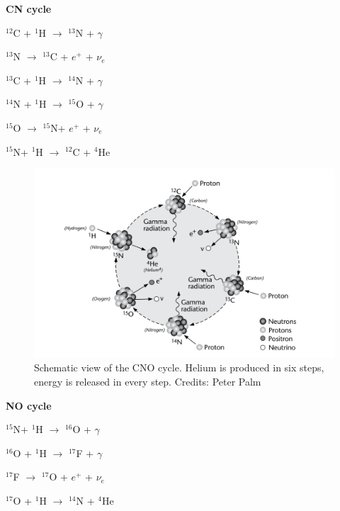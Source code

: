 \vspace{2mm}
\textbf{CN cycle}

$^{12}$C + $^{1}$H $\longrightarrow$ $^{13}$N + $\gamma$

$^{13}$N  $\longrightarrow$ $^{13}$C + $e^{+}$ + $\nu_{e}$

$^{13}$C + $^{1}$H $\longrightarrow$ $^{14}$N + $\gamma$

$^{14}$N + $^{1}$H $\longrightarrow$ $^{15}$O + $\gamma$

$^{15}$O $\longrightarrow$ $^{15}$N+ $e^{+}$ + $\nu_{e}$

$^{15}$N+ $^{1}$H $\longrightarrow$ $^{12}$C + $^{4}$He


\begin{figure}[!ht]
\centering
\includegraphics[width=\textwidth, angle=0]{Img/CNO.png}
\caption{Schematic view of the CNO cycle. Helium is produced in six steps, energy is released in every step. Credits: Peter Palm} 
\label{cno}
\end{figure}


\textbf{NO cycle}

$^{15}$N+ $^{1}$H $\longrightarrow$ $^{16}$O + $\gamma$

$^{16}$O + $^{1}$H $\longrightarrow$ $^{17}$F + $\gamma$

$^{17}$F  $\longrightarrow$ $^{17}$O + $e^{+}$ + $\nu_{e}$

$^{17}$O + $^{1}$H $\longrightarrow$ $^{14}$N + $^{4}$He


